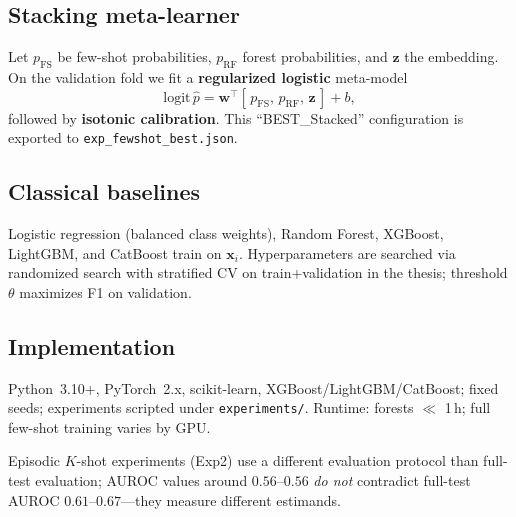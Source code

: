 \subsection{Stacking meta-learner}
Let $p_{\mathrm{FS}}$ be few-shot probabilities, $p_{\mathrm{RF}}$ forest probabilities, and $\mathbf{z}$ the embedding. On the validation fold we fit a \textbf{regularized logistic} meta-model
\begin{equation}
  \mathrm{logit}\,\hat{p} = \mathbf{w}^\top [\,p_{\mathrm{FS}},\, p_{\mathrm{RF}},\, \mathbf{z}\,] + b,
\end{equation}
followed by \textbf{isotonic calibration}. This ``BEST\_Stacked'' configuration is exported to \texttt{exp\_fewshot\_best.json}.

\subsection{Classical baselines}
Logistic regression (balanced class weights), Random Forest, XGBoost, LightGBM, and CatBoost train on $\mathbf{x}_i$. Hyperparameters are searched via randomized search with stratified CV on train+validation in the thesis; threshold $\theta$ maximizes F1 on validation.

\subsection{Implementation}
Python~3.10+, PyTorch~2.x, scikit-learn, XGBoost/LightGBM/CatBoost; fixed seeds; experiments scripted under \texttt{experiments/}. Runtime: forests $\ll$ 1\,h; full few-shot training varies by GPU.

\begin{remark}
Episodic $K$-shot experiments (Exp2) use a different evaluation protocol than full-test evaluation; AUROC values around $0.56$--$0.56$ \emph{do not} contradict full-test AUROC $0.61$--$0.67$---they measure different estimands.
\end{remark}
